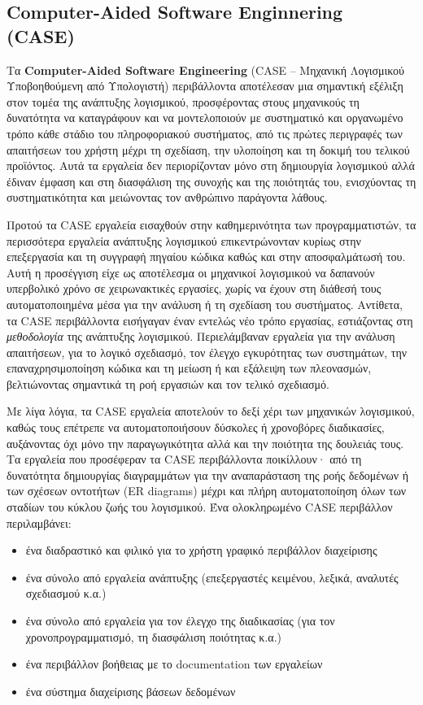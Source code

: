         \subsection{Computer-Aided Software Enginnering (CASE)}
            Τα \textbf{Computer-Aided Software Engineering} (CASE -- Μηχανική Λογισμικού Υποβοηθούμενη από Υπολογιστή) περιβάλλοντα αποτέλεσαν μια σημαντική εξέλιξη στον τομέα της ανάπτυξης λογισμικού, προσφέροντας στους μηχανικούς τη δυνατότητα να καταγράφουν και να μοντελοποιούν με συστηματικό και οργανωμένο τρόπο κάθε στάδιο του πληροφοριακού συστήματος, από τις πρώτες περιγραφές των απαιτήσεων του χρήστη μέχρι τη σχεδίαση, την υλοποίηση και τη δοκιμή του τελικού προϊόντος. Αυτά τα εργαλεία δεν περιορίζονταν μόνο στη δημιουργία λογισμικού αλλά έδιναν έμφαση και στη διασφάλιση της συνοχής και της ποιότητάς του, ενισχύοντας τη συστηματικότητα και μειώνοντας τον ανθρώπινο παράγοντα λάθους.

            Προτού τα CASE εργαλεία εισαχθούν στην καθημερινότητα των προγραμματιστών, τα περισσότερα εργαλεία ανάπτυξης λογισμικού επικεντρώνονταν κυρίως στην επεξεργασία και τη συγγραφή πηγαίου κώδικα καθώς και στην αποσφαλμάτωσή του. Αυτή η προσέγγιση είχε ως αποτέλεσμα οι μηχανικοί λογισμικού να δαπανούν υπερβολικό χρόνο σε χειρωνακτικές εργασίες, χωρίς να έχουν στη διάθεσή τους αυτοματοποιημένα μέσα για την ανάλυση ή τη σχεδίαση του συστήματος. Αντίθετα, τα CASE περιβάλλοντα εισήγαγαν έναν εντελώς νέο τρόπο εργασίας, εστιάζοντας στη \textit{μεθοδολογία} της ανάπτυξης λογισμικού. Περιελάμβαναν εργαλεία για την ανάλυση απαιτήσεων, για το λογικό σχεδιασμό, τον έλεγχο εγκυρότητας των συστημάτων, την επαναχρησιμοποίηση κώδικα και τη μείωση ή και εξάλειψη των πλεονασμών, βελτιώνοντας σημαντικά τη ροή εργασιών και τον τελικό σχεδιασμό.

            Με λίγα λόγια, τα CASE εργαλεία αποτελούν το δεξί χέρι των μηχανικών λογισμικού, καθώς τους επέτρεπε να αυτοματοποιήσουν δύσκολες ή χρονοβόρες διαδικασίες, αυξάνοντας όχι μόνο την παραγωγικότητα αλλά και την ποιότητα της δουλειάς τους. Τα εργαλεία που προσέφεραν τα CASE περιβάλλοντα ποικίλλουν· από τη δυνατότητα δημιουργίας διαγραμμάτων για την αναπαράσταση της ροής δεδομένων ή των σχέσεων οντοτήτων (ER diagrams) μέχρι και πλήρη αυτοματοποίηση όλων των σταδίων του κύκλου ζωής του λογισμικού. Ένα ολοκληρωμένο CASE περιβάλλον περιλαμβάνει:
            \begin{itemize}[label={\tiny \blacksquare}]
                \setlength\itemsep{-0.25em}
                \item ένα διαδραστικό και φιλικό για το χρήστη γραφικό περιβάλλον διαχείρισης
                \item ένα σύνολο από εργαλεία ανάπτυξης (επεξεργαστές κειμένου, λεξικά, αναλυτές σχεδιασμού κ.α.)
                \item ένα σύνολο από εργαλεία για τον έλεγχο της διαδικασίας (για τον χρονοπρογραμματισμό, τη διασφάλιση ποιότητας κ.α.)
                \item ένα περιβάλλον βοήθειας με το documentation των εργαλείων
                \item ένα σύστημα διαχείρισης βάσεων δεδομένων
            \end{itemize}

